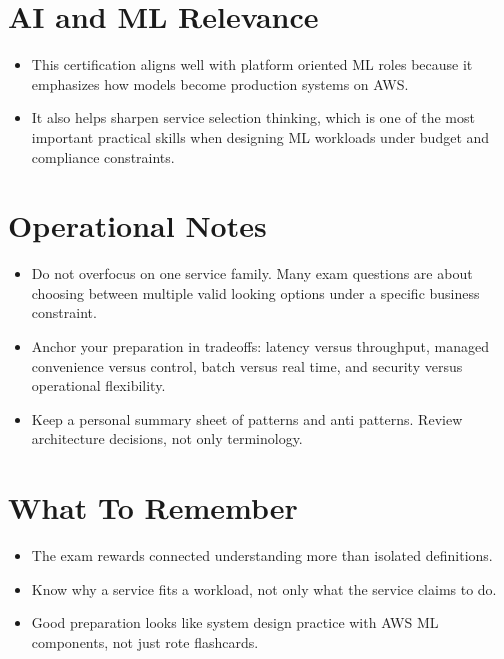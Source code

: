 \documentclass[10pt,twocolumn]{article}
\begin{document}
\section*{AI and ML Relevance}
\begin{itemize}
\item This certification aligns well with platform oriented ML roles because it emphasizes how models become production systems on AWS.
\item It also helps sharpen service selection thinking, which is one of the most important practical skills when designing ML workloads under budget and compliance constraints.
\end{itemize}

\section*{Operational Notes}
\begin{itemize}
\item Do not overfocus on one service family. Many exam questions are about choosing between multiple valid looking options under a specific business constraint.
\item Anchor your preparation in tradeoffs: latency versus throughput, managed convenience versus control, batch versus real time, and security versus operational flexibility.
\item Keep a personal summary sheet of patterns and anti patterns. Review architecture decisions, not only terminology.
\end{itemize}

\section*{What To Remember}
\begin{itemize}
\item The exam rewards connected understanding more than isolated definitions.
\item Know why a service fits a workload, not only what the service claims to do.
\item Good preparation looks like system design practice with AWS ML components, not just rote flashcards.
\end{itemize}
\end{document}
